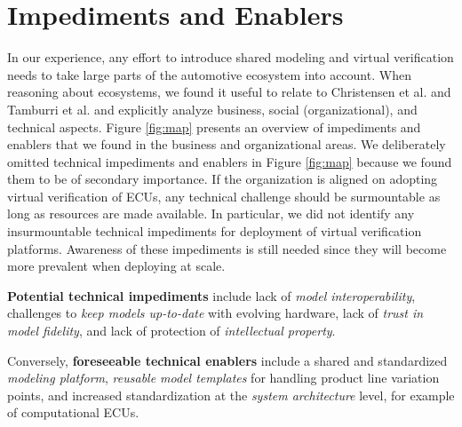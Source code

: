 \section{Impediments and Enablers}\label{sec:impediments_and_enablers}
In our experience, any effort to introduce shared modeling and virtual verification needs to take large parts of the automotive ecosystem into account. 
When reasoning about ecosystems, we found it useful to relate to Christensen et al. \cite{christensen2014analysis} and Tamburri et al. \cite{tamburri2013uncovering} and explicitly analyze business, social (organizational), and technical aspects.
Figure \ref{fig:map} presents an overview of impediments and enablers that we found in the business and organizational areas.
We deliberately omitted technical impediments and enablers in Figure \ref{fig:map} because we found them to be of secondary importance.
If the organization is aligned on adopting virtual verification of ECUs,
any technical challenge should be surmountable as long as resources are made available.
In particular, we did not identify any insurmountable technical impediments for deployment of virtual verification platforms.
Awareness of these impediments is still needed since they will become more prevalent when deploying at scale.

\textbf{Potential technical impediments} include
lack of \emph{model interoperability},
challenges to \emph{keep models up-to-date} with evolving hardware,
lack of \emph{trust in model fidelity},
and lack of protection of \emph{intellectual property}.

Conversely, \textbf{foreseeable technical enablers} include a shared and standardized \emph{modeling platform},
\emph{reusable model templates} for handling product line variation points,
and increased standardization at the \emph{system architecture} level, for example of computational ECUs.



